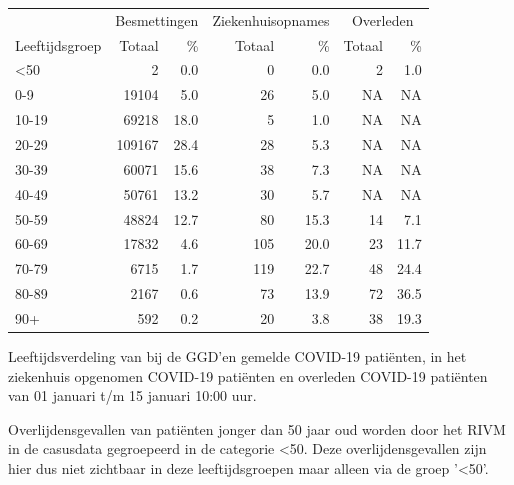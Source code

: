 \documentclass[
  english,
  man,floatsintext]{apa6}
\begin{document}
\begin{table}
\centering\begingroup\fontsize{11}{13}\selectfont

\begin{threeparttable}
\begin{tabular}{lrrrrrr}
\toprule
\multicolumn{1}{c}{ } & \multicolumn{2}{c}{Besmettingen} & \multicolumn{2}{c}{Ziekenhuisopnames} & \multicolumn{2}{c}{Overleden} \\
\cmidrule(l{3pt}r{3pt}){2-3} \cmidrule(l{3pt}r{3pt}){4-5} \cmidrule(l{3pt}r{3pt}){6-7}
Leeftijdsgroep & Totaal & \% & Totaal & \% & Totaal & \%\\
\midrule
<50 & 2 & 0.0 & 0 & 0.0 & 2 & 1.0\\
0-9 & 19104 & 5.0 & 26 & 5.0 & NA & NA\\
10-19 & 69218 & 18.0 & 5 & 1.0 & NA & NA\\
20-29 & 109167 & 28.4 & 28 & 5.3 & NA & NA\\
30-39 & 60071 & 15.6 & 38 & 7.3 & NA & NA\\
40-49 & 50761 & 13.2 & 30 & 5.7 & NA & NA\\
50-59 & 48824 & 12.7 & 80 & 15.3 & 14 & 7.1\\
60-69 & 17832 & 4.6 & 105 & 20.0 & 23 & 11.7\\
70-79 & 6715 & 1.7 & 119 & 22.7 & 48 & 24.4\\
80-89 & 2167 & 0.6 & 73 & 13.9 & 72 & 36.5\\
90+ & 592 & 0.2 & 20 & 3.8 & 38 & 19.3\\
\bottomrule
\end{tabular}
\begin{tablenotes}
\item[1] Leeftijdsverdeling van bij de GGD’en gemelde COVID-19 patiënten, in het ziekenhuis opgenomen COVID-19 patiënten en overleden COVID-19 patiënten van 01 januari t/m 15 januari 10:00 uur.
\item[2] Overlijdensgevallen van patiënten jonger dan 50 jaar oud worden door het RIVM in de casusdata gegroepeerd in de categorie <50. Deze overlijdensgevallen zijn hier dus niet zichtbaar in deze leeftijdsgroepen maar alleen via de groep '<50'.
\end{tablenotes}
\end{threeparttable}
\endgroup{}
\end{table}

\newpage
\end{document}
